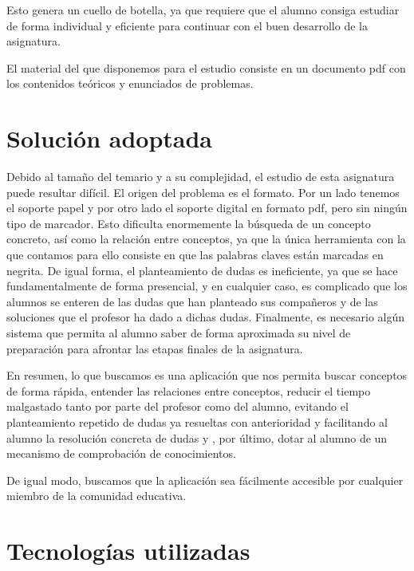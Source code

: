 \documentclass[openright,twoside,10pt]{book}
\begin{document}
    Esto genera un cuello de botella, ya que requiere que el alumno consiga
    estudiar de forma individual y eficiente para continuar con el buen
    desarrollo de la asignatura.
    
    El material del que disponemos para el estudio consiste en un documento
    pdf con los contenidos teóricos y enunciados de problemas.
    
    \chapter{Solución adoptada}\label{soluciuxf3n-adoptada}
    
    Debido al tamaño del temario y a su complejidad, el estudio de esta
    asignatura puede resultar difícil. El origen del problema es el formato.
    Por un lado tenemos el soporte papel y por otro lado el soporte digital
    en formato pdf, pero sin ningún tipo de marcador. Esto dificulta
    enormemente la búsqueda de un concepto concreto, así como la relación
    entre conceptos, ya que la única herramienta con la que contamos para
    ello consiste en que las palabras claves están marcadas en negrita. De
    igual forma, el planteamiento de dudas es ineficiente, ya que se hace
    fundamentalmente de forma presencial, y en cualquier caso, es complicado
    que los alumnos se enteren de las dudas que han planteado sus compañeros
    y de las soluciones que el profesor ha dado a dichas dudas. Finalmente,
    es necesario algún sistema que permita al alumno saber de forma
    aproximada su nivel de preparación para afrontar las etapas finales de
    la asignatura.
    
    En resumen, lo que buscamos es una aplicación que nos permita buscar
    conceptos de forma rápida, entender las relaciones entre conceptos,
    reducir el tiempo malgastado tanto por parte del profesor como del
    alumno, evitando el planteamiento repetido de dudas ya resueltas con
    anterioridad y facilitando al alumno la resolución concreta de dudas y ,
    por último, dotar al alumno de un mecanismo de comprobación de
    conocimientos.
    
    De igual modo, buscamos que la aplicación sea fácilmente accesible por
    cualquier miembro de la comunidad educativa.
    
    \chapter{Tecnologías utilizadas}\label{tecnologuxedas-utilizadas}
    
\end{document}
